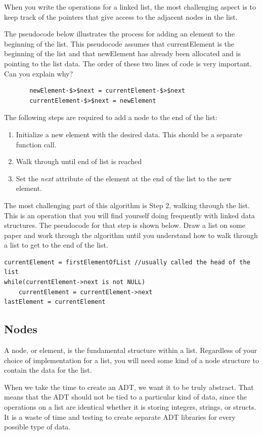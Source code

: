 When you write the operations for a linked list, the most challenging aspect is to keep track of the pointers that give access to the adjacent nodes in the list.

The pseudocode below illustrates the process for adding an element to the beginning of the list. This pseudocode assumes that currentElement is the beginning of the list and that newElement has already been allocated and is pointing to the list data.  The order of these two lines of code is very important. Can you explain why?     

\begin{lstlisting}
       newElement-$>$next = currentElement-$>$next     
       currentElement-$>$next = newElement
\end{lstlisting}


The following steps are required to add a node to the end of the list:
\begin{enumerate}
\item Initialize a new element with the desired data.  This should be a separate function call.     
\item Walk through until end of list is reached 
\item Set the \textit{next} attribute of the element at the end of the list to the new element.    
\end{enumerate}

The most challenging part of this algorithm is  Step 2, walking through the list.   This is an operation that you will find yourself doing frequently with linked data structures.  The pseudocode for that step is shown below.  Draw a list on some paper and work through the algorithm until you understand how to walk through a list to get to the end of the list.

\begin{lstlisting}
currentElement = firstElementOfList //usually called the head of the list
while(currentElement->next is not NULL)
    currentElement = currentElement->next
lastElement = currentElement
\end{lstlisting}


\subsection{Nodes}
A node, or element,  is the fundamental  structure within a list. Regardless of your choice of implementation for a list, you will need some kind of a node structure to contain the data for the list.

When we take the time to create an ADT, we want it to be truly abstract.  That means that the ADT should not be tied to a particular kind of data, since the operations on a list are identical whether it is storing integers, strings, or structs.   It is a waste of time and testing to create separate ADT libraries for every possible type of data.

